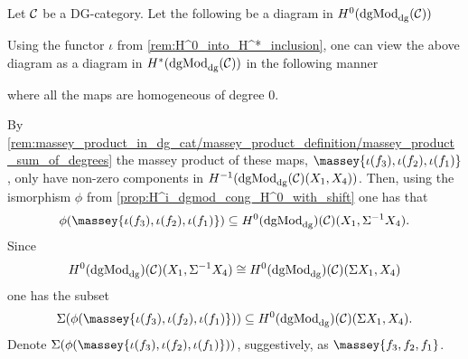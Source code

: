 \begin{remark}
    \label{rem:massey_in_H^0(dgMod_dg)}
    Let \( {\mathcal{C}} \) be a DG-category. Let the following be a diagram in \( H^0(\operatorname{dgMod}_{\operatorname{dg}}({\mathcal{C}})) \)
    \begin{center}
    \end{center}
    Using the functor \( \iota \) from \autoref{rem:H^0_into_H^*_inclusion}, one can view the above diagram as a diagram in \( H^*(\operatorname{dgMod}_{\operatorname{dg}}({\mathcal{C}})) \) in the following manner
    \begin{center}
    \end{center}
    where all the maps are homogeneous of degree \( 0 \).

    By \autoref{rem:massey_product_in_dg_cat/massey_product_definition/massey_product_sum_of_degrees} the massey product of these maps, \( \massey{\iota(f_3), \iota(f_2), \iota(f_1)} \), only have non-zero components in \( H^{-1}(\operatorname{dgMod}_{\operatorname{dg}}({\mathcal{C}})(X_1, X_4)) \). Then, using the ismorphism \( \phi \) from \autoref{prop:H^i_dgmod_cong_H^0_with_shift} one has that
    \[
        \phi(\massey{\iota(f_3), \iota(f_2), \iota(f_1)}) \subseteq H^0(\dgMod_{\dg})(\Cc)(X_1, \Sigma^{-1} X_4).
    \]
    Since
    \[
        H^0(\operatorname{dgMod}_{\operatorname{dg}})({\mathcal{C}})(X_1, \Sigma^{-1} X_4) \cong H^0(\operatorname{dgMod}_{\operatorname{dg}})({\mathcal{C}})(\Sigma X_1, X_4)
    \]
    one has the subset
    \[
        \Sigma(\phi(\massey{\iota(f_3), \iota(f_2), \iota(f_1)})) \subseteq H^0(\dgMod_{\dg})(\Cc)(\Sigma X_1, X_4).
    \]
    Denote \( \Sigma(\phi(\massey{\iota(f_3), \iota(f_2), \iota(f_1)})) \), suggestively, as \( \massey{f_3, f_2, f_1} \).
\end{remark}


